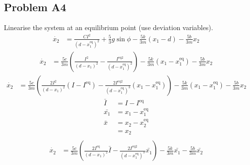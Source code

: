 \subsection*{Problem A4} Linearise the system at an equilibrium point (use deviation variables).
    \begin{align}
        {\dot{x_2}} &= {\frac{CI^2}{(d -{x_1^\text{eq}})^2}}+{\frac{5}{3}g\sin{\phi}}-{\frac{5k}{3m}{(x_1 - d)}}-{\frac{5b}{3m}{x_2}}\nonumber
    \end{align}
    \begin{align}
        {\dot{x_2}} &= {\frac{5c}{3m}( \frac{I^2}{(d -{x_1})^2} -  \frac{I^{\text{eq}2}}{(d -{x_1^\text{eq}})^2})}-{\frac{5k}{3m}{(x_1 -
        {x_1^\text{eq}})}}-{\frac{5b}{3m}{x_2}}\nonumber
    \end{align}
    \begin{align}
        {\dot{x_2}} &= {\frac{5c}{3m}( \frac{2I^2}{(d -{x_1})^2}(I - I^\text{eq}) -  \frac{2I^{\text{eq}2}}{(d -{x_1^\text{eq}})^3}(x_1 - {x_1^\text{eq}}))}-{\frac{5k}{3m}{(x_1 -
        {x_1^\text{eq}})}}-{\frac{5b}{3m}{x_2}}\nonumber
    \end{align}
    \begin{align} 
        \nonumber 
        \bar{I} &= I - I^\text{eq} \\ \nonumber 
        \bar{x_1} &= {x_1} - {x_1^\text{eq}} \\ \nonumber
        \bar{x} &= {x_2} - {x_2^\text{eq}} \\ \nonumber &= {x_2} \\ \nonumber
    \end{align}
    \begin{align}
        {\dot{x_2}} &= {\frac{5c}{3m}( \frac{2I^\text{eq}}{(d -{x_1})^2}\bar{I} -  \frac{2I^{\text{eq}2}}{(d -{x_1^\text{eq}})^3}\bar{x_1})}-{\frac{5k}{3m}{\bar{x_1}}}-{\frac{5b}{3m}\bar{x_2}}\nonumber
    \end{align}
